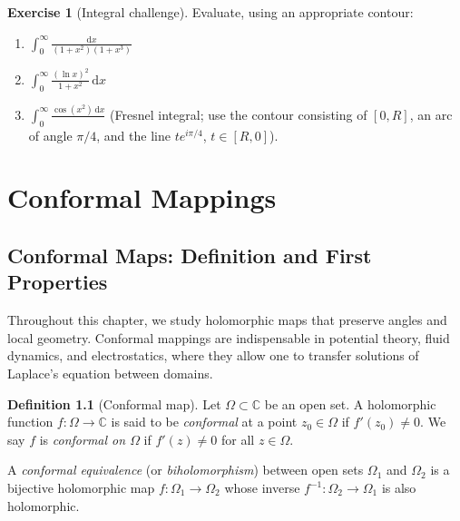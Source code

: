 \documentclass[12pt,a4paper,openany]{book}
\theoremstyle{definition}
\newtheorem{definition}{Definition}[chapter]
\newtheorem{exercise}{Exercise}[chapter]
\theoremstyle{plain}
\theoremstyle{remark}
\newcommand{\C}{\mathbb{C}}
\newcommand{\dd}{\mathrm{d}}
\begin{document}
\begin{exercise}[Integral challenge]\label{exer:challenge}
Evaluate, using an appropriate contour:
\begin{enumerate}[label=(\alph*)]
  \item $\displaystyle\int_0^{\infty}
        \frac{\dd x}{(1+x^2)(1+x^3)}$
  \item $\displaystyle\int_0^{\infty}
        \frac{(\ln x)^2}{1+x^2}\,\dd x$
  \item $\displaystyle\int_0^{\infty}
        \frac{\cos(x^2)\,\dd x}{\phantom{x}}$ \quad
        (Fresnel integral; use the contour consisting of $[0,R]$,
        an arc of angle $\pi/4$, and the line $te^{i\pi/4}$,
        $t\in[R,0]$).
\end{enumerate}
\end{exercise}


\chapter{Conformal Mappings}\label{ch:conformal}

\section{Conformal Maps: Definition and First Properties}
\label{sec:conformal-def}

Throughout this chapter, we study holomorphic maps that preserve angles
and local geometry.  Conformal mappings are indispensable in potential
theory, fluid dynamics, and electrostatics, where they allow one to
transfer solutions of Laplace's equation between domains.

\begin{definition}[Conformal map]\label{def:conformal}
Let $\Omega\subset\C$ be an open set.  A holomorphic function
$f\colon\Omega\to\C$ is said to be \emph{conformal} at a point
$z_0\in\Omega$ if $f'(z_0)\neq 0$.  We say $f$ is \emph{conformal on
$\Omega$} if $f'(z)\neq 0$ for all $z\in\Omega$.

A \emph{conformal equivalence} (or \emph{biholomorphism}) between open
sets $\Omega_1$ and $\Omega_2$ is a bijective holomorphic map
$f\colon\Omega_1\to\Omega_2$ whose inverse $f^{-1}\colon\Omega_2\to\Omega_1$
is also holomorphic.
\end{definition}
\end{document}

